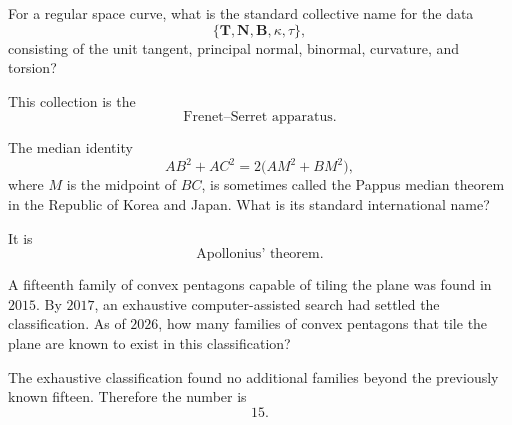     \begin{expectedproblem}
        For a regular space curve, what is the standard collective name for the
        data
        \[
            \{\mathbf{T},\mathbf{N},\mathbf{B},\kappa,\tau\},
        \]
        consisting of the unit tangent, principal normal, binormal, curvature,
        and torsion?
    \end{expectedproblem}

    \begin{solution}
        This collection is the
        \[
            \boxed{\text{Frenet--Serret apparatus}}.
        \]
    \end{solution}

    \begin{expectedproblem}
        The median identity
        \[
            AB^2+AC^2
            =
            2\bigl(AM^2+BM^2\bigr),
        \]
        where $M$ is the midpoint of $BC$, is sometimes called the Pappus
        median theorem in the Republic of Korea and Japan. What is its standard international
        name?
    \end{expectedproblem}

    \begin{solution}
        It is
        \[
            \boxed{\text{Apollonius' theorem}}.
        \]
    \end{solution}

    \begin{expectedproblem}
        A fifteenth family of convex pentagons capable of tiling the plane was
        found in $2015$. By $2017$, an exhaustive computer-assisted search had
        settled the classification. As of $2026$, how many families of convex
        pentagons that tile the plane are known to exist in this classification?
    \end{expectedproblem}

    \begin{solution}
        The exhaustive classification found no additional families beyond the
        previously known fifteen. Therefore the number is
        \[
            \boxed{15}.
        \]
    \end{solution}

